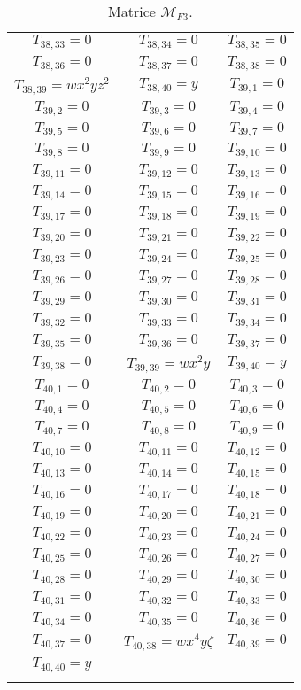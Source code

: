\begin{longtable}{|c|c|c|}
$T_{38,33}= 0$&
$T_{38,34}= 0$&
$T_{38,35}= 0$\\
$T_{38,36}= 0$&
$T_{38,37}= 0$&
$T_{38,38}= 0$\\
$T_{38,39}= wx^2yz^2$&
$T_{38,40}= y$&
$T_{39,1}= 0$\\
$T_{39,2}= 0$&
$T_{39,3}= 0$&
$T_{39,4}= 0$\\
$T_{39,5}= 0$&
$T_{39,6}= 0$&
$T_{39,7}= 0$\\
$T_{39,8}= 0$&
$T_{39,9}= 0$&
$T_{39,10}= 0$\\
$T_{39,11}= 0$&
$T_{39,12}= 0$&
$T_{39,13}= 0$\\
$T_{39,14}= 0$&
$T_{39,15}= 0$&
$T_{39,16}= 0$\\
$T_{39,17}= 0$&
$T_{39,18}= 0$&
$T_{39,19}= 0$\\
$T_{39,20}= 0$&
$T_{39,21}= 0$&
$T_{39,22}= 0$\\
$T_{39,23}= 0$&
$T_{39,24}= 0$&
$T_{39,25}= 0$\\
$T_{39,26}= 0$&
$T_{39,27}= 0$&
$T_{39,28}= 0$\\
$T_{39,29}= 0$&
$T_{39,30}= 0$&
$T_{39,31}= 0$\\
$T_{39,32}= 0$&
$T_{39,33}= 0$&
$T_{39,34}= 0$\\
$T_{39,35}= 0$&
$T_{39,36}= 0$&
$T_{39,37}= 0$\\
$T_{39,38}= 0$&
$T_{39,39}= wx^2y$&
$T_{39,40}= y$\\
$T_{40,1}= 0$&
$T_{40,2}= 0$&
$T_{40,3}= 0$\\
$T_{40,4}= 0$&
$T_{40,5}= 0$&
$T_{40,6}= 0$\\
$T_{40,7}= 0$&
$T_{40,8}= 0$&
$T_{40,9}= 0$\\
$T_{40,10}= 0$&
$T_{40,11}= 0$&
$T_{40,12}= 0$\\
$T_{40,13}= 0$&
$T_{40,14}= 0$&
$T_{40,15}= 0$\\
$T_{40,16}= 0$&
$T_{40,17}= 0$&
$T_{40,18}= 0$\\
$T_{40,19}= 0$&
$T_{40,20}= 0$&
$T_{40,21}= 0$\\
$T_{40,22}= 0$&
$T_{40,23}= 0$&
$T_{40,24}= 0$\\
$T_{40,25}= 0$&
$T_{40,26}= 0$&
$T_{40,27}= 0$\\
$T_{40,28}= 0$&
$T_{40,29}= 0$&
$T_{40,30}= 0$\\
$T_{40,31}= 0$&
$T_{40,32}= 0$&
$T_{40,33}= 0$\\
$T_{40,34}= 0$&
$T_{40,35}= 0$&
$T_{40,36}= 0$\\
$T_{40,37}= 0$&
$T_{40,38}= wx^4y\zeta$&
$T_{40,39}= 0$\\
$T_{40,40}= y$&\\
\hline
\caption{\label{tab2} Matrice $\mathcal{M}_{F3}$.}
\end{longtable} 
